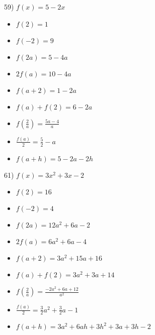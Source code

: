 \documentclass[11pt]{book}
\theoremstyle{definition}  %
\begin{document}

59) $f(x)=5-2x$
\scriptsize
\begin{multicols}{3}
\begin{itemize}
\item  $f(2)=1$
\item  $f(-2)=9$
\item  $f(2a)=5-4a$
\end{itemize}
\end{multicols}

\begin{multicols}{3}
\begin{itemize}
\item  $2 f(a)=10-4a$
\item $f(a+2)=1-2a$
\item $f(a) + f(2)=6-2a$
\end{itemize}
\end{multicols}

\begin{multicols}{3}
\begin{itemize}
\item  $f \left( \frac{2}{a} \right)=\frac{5a-4}{a}$
\item $\frac{f(a)}{2}=\frac{5}{2}-a$
\item  $f(a + h)=5-2a-2h$
\end{itemize}
\end{multicols}
\normalsize

61) $f(x)=3x^2+3x-2$
\scriptsize
\begin{multicols}{3}
\begin{itemize}
\item  $f(2)=16$
\item  $f(-2)=4$
\item  $f(2a)=12a^2+6a-2$
\end{itemize}
\end{multicols}

\begin{multicols}{3}
\begin{itemize}
\item  $2 f(a)=6a^2+6a-4$
\item $f(a+2)=3a^2+15a+16$
\item $f(a) + f(2)=3a^2+3a+14$
\end{itemize}
\end{multicols}

\begin{multicols}{3}
\begin{itemize}
\item  $f \left( \frac{2}{a} \right)=\frac{-2a^2+6a+12}{a^2}$
\item $\frac{f(a)}{2}=\frac{3}{2}a^2+\frac{3}{2}a-1$
\item  $f(a + h)=3a^2+6ah+3h^2+3a+3h-2$
\end{itemize}
\end{multicols}
\normalsize
\end{document}
